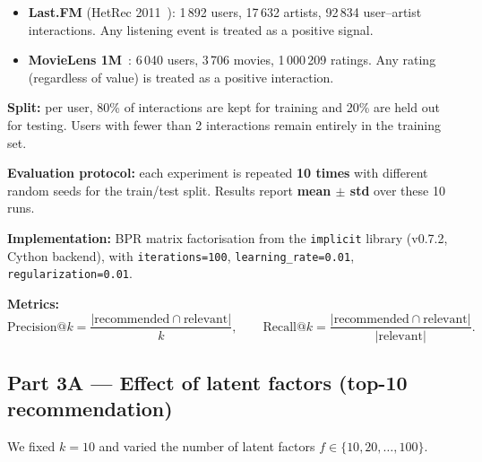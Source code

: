 \documentclass[12pt, a4paper]{article}
\begin{document}
\begin{itemize}
  \item \textbf{Last.FM} (HetRec 2011~\cite{cantador2011}):
        1\,892 users, 17\,632 artists, 92\,834 user--artist interactions.
        Any listening event is treated as a positive signal.
  \item \textbf{MovieLens 1M}~\cite{harper2015movielens}:
        6\,040 users, 3\,706 movies, 1\,000\,209 ratings.
        Any rating (regardless of value) is treated as a positive interaction.
\end{itemize}

\textbf{Split:} per user, 80\% of interactions are kept for training and
20\% are held out for testing. Users with fewer than 2 interactions remain
entirely in the training set.

\textbf{Evaluation protocol:} each experiment is repeated \textbf{10 times}
with different random seeds for the train/test split.
Results report \textbf{mean $\pm$ std} over these 10 runs.

\textbf{Implementation:} BPR matrix factorisation from the
\texttt{implicit} library (v0.7.2, Cython backend), with
\texttt{iterations=100}, \texttt{learning\_rate=0.01},
\texttt{regularization=0.01}.

\textbf{Metrics:}
\[
  \text{Precision@}k = \frac{|\text{recommended} \cap \text{relevant}|}{k},
  \qquad
  \text{Recall@}k = \frac{|\text{recommended} \cap \text{relevant}|}{|\text{relevant}|}.
\]

\subsection{Part 3A — Effect of latent factors (top-10 recommendation)}

We fixed $k = 10$ and varied the number of latent factors
$f \in \{10, 20, \ldots, 100\}$.
\end{document}
